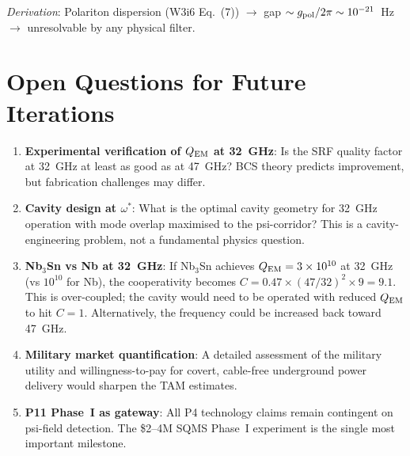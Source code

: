 \documentclass[11pt]{article}
\newcommand{\ee}[1]{\times 10^{#1}}
\newcommand{\QEM}{Q_{\rm EM}}
\begin{document}
\begin{enumerate}
  \emph{Derivation}: Polariton dispersion (W3i6 Eq.~(7)) $\to$ gap
  $\sim g_{\rm pol}/2\pi \sim 10^{-21}$~Hz $\to$ unresolvable by any
  physical filter.

\end{enumerate}

\section{Open Questions for Future Iterations}
\label{sec:open}

\begin{enumerate}
\item \textbf{Experimental verification of $\QEM$ at 32~GHz}: Is the SRF
  quality factor at 32~GHz at least as good as at 47~GHz? BCS theory
  predicts improvement, but fabrication challenges may differ.

\item \textbf{Cavity design at $\omega^*$}: What is the optimal cavity
  geometry for 32~GHz operation with mode overlap maximised to the
  psi-corridor? This is a cavity-engineering problem, not a fundamental
  physics question.

\item \textbf{Nb$_3$Sn vs Nb at 32~GHz}: If Nb$_3$Sn achieves $\QEM =
  3\ee{10}$ at 32~GHz (vs $10^{10}$ for Nb), the cooperativity becomes
  $C = 0.47 \times (47/32)^2 \times 9 = 9.1$. This is over-coupled;
  the cavity would need to be operated with reduced $\QEM$ to hit $C = 1$.
  Alternatively, the frequency could be increased back toward 47~GHz.

\item \textbf{Military market quantification}: A detailed assessment of
  the military utility and willingness-to-pay for covert, cable-free
  underground power delivery would sharpen the TAM estimates.

\item \textbf{P11 Phase~I as gateway}: All P4 technology claims remain
  contingent on psi-field detection. The \$2--4M SQMS Phase~I experiment
  is the single most important milestone.
\end{enumerate}
\end{document}

